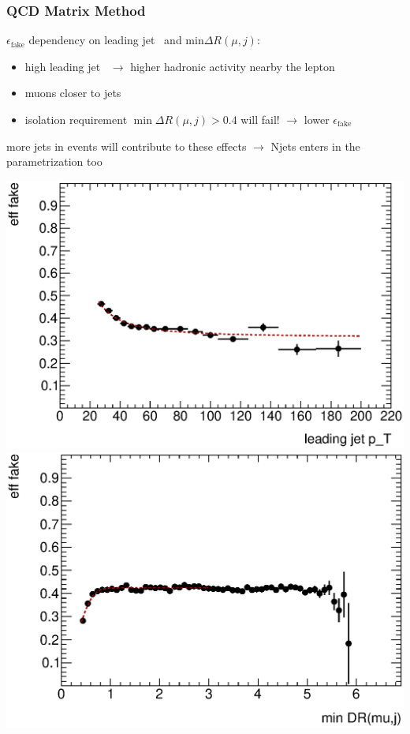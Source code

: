 \begin{frame}\frametitle{QCD Matrix Method}
\centering\scriptsize

$\epsilon_\mathrm{fake}$ dependency on leading jet \pt\ and min$\Delta R(\mu,j)$:
\begin{itemize}
\item high leading jet \pt\ $\to$ higher hadronic activity nearby the lepton
\item muons closer to jets
\item isolation requirement $\min\Delta R(\mu,j)>0.4$ will fail! $\to$ lower $\epsilon_\mathrm{fake}$
\end{itemize}
more jets in events will contribute to these effects $\to$ Njets enters in the parametrization too

\includegraphics[width=.45\textwidth]{../appendices/figures/mujets_mmB/fit_h_lep_LJpT_rb_muon_fake_untagged}
\includegraphics[width=.45\textwidth]{../appendices/figures/mujets_mmB/fit_h_lep_minDR_muon_fake_untagged}


\end{frame}



